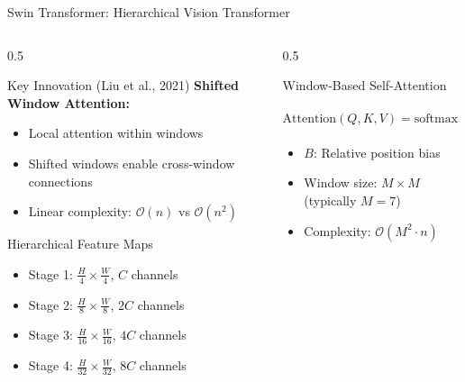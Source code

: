\documentclass[aspectratio=169]{beamer}
\begin{document}
\begin{frame}{Swin Transformer: Hierarchical Vision Transformer}
    \begin{columns}
        \begin{column}{0.5\textwidth}
            \begin{block}{Key Innovation (Liu et al., 2021)}
                \textbf{Shifted Window Attention:}
                \begin{itemize}
                    \item Local attention within windows
                    \item Shifted windows enable cross-window connections
                    \item Linear complexity: $\mathcal{O}(n)$ vs $\mathcal{O}(n^2)$
                \end{itemize}
            \end{block}
            
            \begin{block}{Hierarchical Feature Maps}
                \begin{itemize}
                    \item Stage 1: $\frac{H}{4} \times \frac{W}{4}$, $C$ channels
                    \item Stage 2: $\frac{H}{8} \times \frac{W}{8}$, $2C$ channels
                    \item Stage 3: $\frac{H}{16} \times \frac{W}{16}$, $4C$ channels
                    \item Stage 4: $\frac{H}{32} \times \frac{W}{32}$, $8C$ channels
                \end{itemize}
            \end{block}
        \end{column}
        \begin{column}{0.5\textwidth}
            \begin{block}{Window-Based Self-Attention}
                \begin{center}
                    $\text{Attention}(Q, K, V) = \text{softmax}\left(\frac{QK^T}{\sqrt{d}} + B\right)V$
                \end{center}
                \begin{itemize}
                    \item $B$: Relative position bias
                    \item Window size: $M \times M$ (typically $M=7$)
                    \item Complexity: $\mathcal{O}(M^2 \cdot n)$
                \end{itemize}
            \end{block}
            

\end{column}
\end{columns}
\end{frame}
\end{document}
